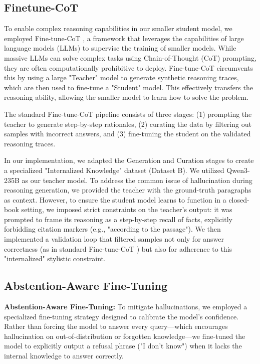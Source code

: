 \documentclass{article}
\begin{document}
\subsection{Finetune-CoT} \label{sec:finetune-cot}
To enable complex reasoning capabilities in our smaller student model, we employed Fine-tune-CoT \cite{ho2023largelanguagemodelsreasoning}, a framework that leverages the capabilities of large language models (LLMs) to supervise the training of smaller models. While massive LLMs can solve complex tasks using Chain-of-Thought (CoT) prompting, they are often computationally prohibitive to deploy. Fine-tune-CoT circumvents this by using a large "Teacher" model to generate synthetic reasoning traces, which are then used to fine-tune a "Student" model. This effectively transfers the reasoning ability, allowing the smaller model to learn how to solve the problem.

The standard Fine-tune-CoT pipeline consists of three stages: (1) prompting the teacher to generate step-by-step rationales, (2) curating the data by filtering out samples with incorrect answers, and (3) fine-tuning the student on the validated reasoning traces.

In our implementation, we adapted the Generation and Curation stages to create a specialized "Internalized Knowledge" dataset (Dataset B). We utilized Qwen3-235B as our teacher model. To address the common issue of hallucination during reasoning generation, we provided the teacher with the ground-truth paragraphs as context. However, to ensure the student model learns to function in a closed-book setting, we imposed strict constraints on the teacher's output: it was prompted to frame its reasoning as a step-by-step recall of facts, explicitly forbidding citation markers (e.g., "according to the passage"). We then implemented a validation loop that filtered samples not only for answer correctness (as in standard Fine-tune-CoT ) but also for adherence to this "internalized" stylistic constraint.

\subsection{Abstention-Aware Fine-Tuning} \label{sec:abstension}
\textbf{Abstention-Aware Fine-Tuning: }To mitigate hallucinations, we employed a specialized fine-tuning strategy designed to calibrate the model's confidence. Rather than forcing the model to answer every query—which encourages hallucination on out-of-distribution or forgotten knowledge—we fine-tuned the model to explicitly output a refusal phrase ("I don't know") when it lacks the internal knowledge to answer correctly. 
\end{document}
